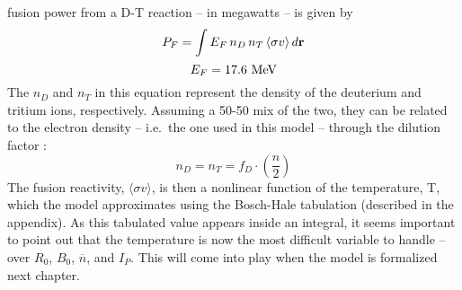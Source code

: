    fusion power from a D-T reaction -- in megawatts -- is given by 
 \begin{equation}
 	\label{eq:pf_int}
 	P_F = \int E_F \, n_D \, n_T \, \langle \sigma v \rangle \, d \vec{\bold{r}}
 \end{equation}
\begin{equation}
	E_F = 17.6 \ \textnormal{MeV}
\end{equation}
 The $n_D$ and $n_T$ in this equation  represent the density of the deuterium and tritium ions, respectively. Assuming a 50-50 mix of the two, they can be related to the electron density -- i.e.\ the one used in this model -- through the dilution factor :
 \begin{equation}
 	n_D = n_T = f_D \cdot \left( \frac{n}{2} \right)
 \end{equation}
 The fusion reactivity, $\langle \sigma v \rangle$, is then a nonlinear function of the temperature, T, which the model approximates using the Bosch-Hale tabulation (described in the appendix). As this tabulated value appears inside an integral, it seems important to point out that the temperature is now the most difficult  variable to handle -- over $R_0$, $B_0$, $\overline n$, and $I_P$. This will come into play when the model is formalized next chapter.
 
